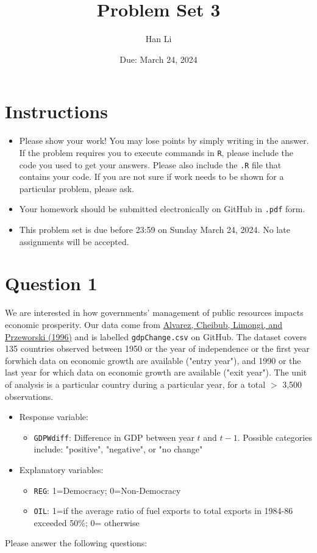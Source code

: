 \documentclass[12pt,letterpaper]{article}
\title{Problem Set 3}
\date{Due: March 24, 2024}
\author{Han Li}
\begin{document}
	\maketitle
	\section*{Instructions}
	\begin{itemize}
	\item Please show your work! You may lose points by simply writing in the answer. If the problem requires you to execute commands in \texttt{R}, please include the code you used to get your answers. Please also include the \texttt{.R} file that contains your code. If you are not sure if work needs to be shown for a particular problem, please ask.
\item Your homework should be submitted electronically on GitHub in \texttt{.pdf} form.
\item This problem set is due before 23:59 on Sunday March 24, 2024. No late assignments will be accepted.
	\end{itemize}

	\vspace{.25cm}
\section*{Question 1}
\vspace{.25cm}
\noindent We are interested in how governments' management of public resources impacts economic prosperity. Our data come from \href{https://www.researchgate.net/profile/Adam_Przeworski/publication/240357392_Classifying_Political_Regimes/links/0deec532194849aefa000000/Classifying-Political-Regimes.pdf}{Alvarez, Cheibub, Limongi, and Przeworski (1996)} and is labelled \texttt{gdpChange.csv} on GitHub. The dataset covers 135 countries observed between 1950 or the year of independence or the first year forwhich data on economic growth are available ("entry year"), and 1990 or the last year for which data on economic growth are available ("exit year"). The unit of analysis is a particular country during a particular year, for a total $>$ 3,500 observations. 

\begin{itemize}
	\item
	Response variable: 
	\begin{itemize}
		\item \texttt{GDPWdiff}: Difference in GDP between year $t$ and $t-1$. Possible categories include: "positive", "negative", or "no change"
	\end{itemize}
	\item
	Explanatory variables: 
	\begin{itemize}
		\item
		\texttt{REG}: 1=Democracy; 0=Non-Democracy
		\item
		\texttt{OIL}: 1=if the average ratio of fuel exports to total exports in 1984-86 exceeded 50\%; 0= otherwise
	\end{itemize}
	
\end{itemize}
\newpage
\noindent Please answer the following questions:
\end{document}
